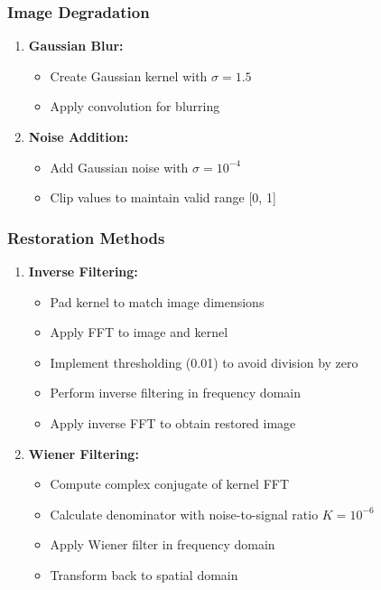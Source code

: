 \documentclass[12pt,a4paper]{article}
\begin{document}
\subsubsection{Image Degradation}
\begin{enumerate}
  \item \textbf{Gaussian Blur:}
    \begin{itemize}
      \item Create Gaussian kernel with \(\sigma = 1.5\)
      \item Apply convolution for blurring
    \end{itemize}

  \item \textbf{Noise Addition:}
    \begin{itemize}
      \item Add Gaussian noise with \(\sigma = 10^{-4}\)
      \item Clip values to maintain valid range [0, 1]
    \end{itemize}
\end{enumerate}

\subsubsection{Restoration Methods}
\begin{enumerate}
  \item \textbf{Inverse Filtering:}
    \begin{itemize}
      \item Pad kernel to match image dimensions
      \item Apply FFT to image and kernel
      \item Implement thresholding (0.01) to avoid division by zero
      \item Perform inverse filtering in frequency domain
      \item Apply inverse FFT to obtain restored image
    \end{itemize}

  \item \textbf{Wiener Filtering:}
    \begin{itemize}
      \item Compute complex conjugate of kernel FFT
      \item Calculate denominator with noise-to-signal ratio \(K = 10^{-6}\)
      \item Apply Wiener filter in frequency domain
      \item Transform back to spatial domain
    \end{itemize}
\end{enumerate}
\end{document}
